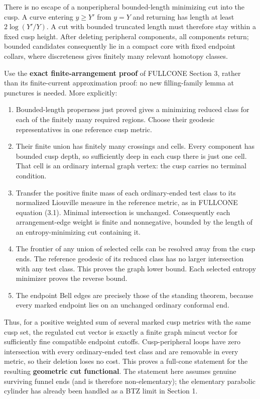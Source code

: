 \documentclass[11pt]{article}
\providecommand{\tightlist}{\setlength{\itemsep}{1pt}\setlength{\parskip}{0pt}}
\begin{document}
There is no escape of a nonperipheral bounded-length minimizing cut into
the cusp. A curve entering \(y\ge Y'\) from \(y=Y\) and returning has
length at least \(2\log(Y'/Y)\). A cut with bounded truncated length
must therefore stay within a fixed cusp height. After deleting
peripheral components, all components return; bounded candidates
consequently lie in a compact core with fixed endpoint collars, where
discreteness gives finitely many relevant homotopy classes.

Use the \textbf{exact finite-arrangement proof} of FULLCONE Section 3,
rather than its finite-current approximation proof: no new
filling-family lemma at punctures is needed. More explicitly:

\begin{enumerate}
\def\labelenumi{\arabic{enumi}.}
\tightlist
\item
  Bounded-length properness just proved gives a minimizing reduced class
  for each of the finitely many required regions. Choose their geodesic
  representatives in one reference cusp metric.
\item
  Their finite union has finitely many crossings and cells. Every
  component has bounded cusp depth, so sufficiently deep in each cusp
  there is just one cell. That cell is an ordinary internal graph
  vertex: the cusp carries no terminal condition.
\item
  Transfer the positive finite mass of each ordinary-ended test class to
  its normalized Liouville measure in the reference metric, as in
  FULLCONE equation (3.1). Minimal intersection is unchanged.
  Consequently each arrangement-edge weight is finite and nonnegative,
  bounded by the length of an entropy-minimizing cut containing it.
\item
  The frontier of any union of selected cells can be resolved away from
  the cusp ends. The reference geodesic of its reduced class has no
  larger intersection with any test class. This proves the graph lower
  bound. Each selected entropy minimizer proves the reverse bound.
\item
  The endpoint Bell edges are precisely those of the standing theorem,
  because every marked endpoint lies on an unchanged ordinary conformal
  end.
\end{enumerate}

Thus, for a positive weighted sum of several marked cusp metrics with
the same cusp set, the regulated cut vector is exactly a finite graph
mincut vector for sufficiently fine compatible endpoint cutoffs.
Cusp-peripheral loops have zero intersection with every ordinary-ended
test class and are removable in every metric, so their deletion loses no
cost. This proves a full-cone statement for the resulting
\textbf{geometric cut functional}. The statement here assumes genuine
surviving funnel ends (and is therefore non-elementary); the elementary
parabolic cylinder has already been handled as a BTZ limit in Section 1.
\end{document}
